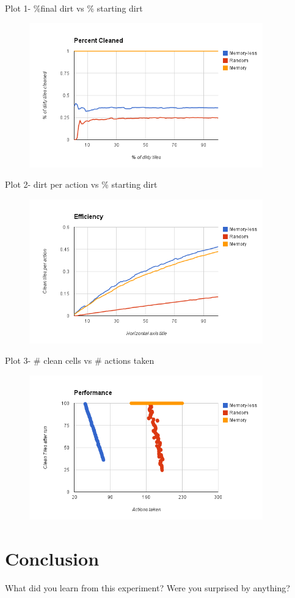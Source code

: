 \documentclass[a4paper,10pt]{article}
\begin{document}
Plot 1- \%final dirt vs \% starting dirt \\
\begin{figure}[!h]
	\begin{center}
		\includegraphics[width=0.9\textwidth]{image.png}
	\end{center}
\end{figure}


Plot 2- dirt per action vs \% starting dirt
\begin{figure}[!ht]
	\includegraphics[width=0.9\textwidth]{image1.png}
\end{figure}
Plot 3- \# clean cells vs \# actions taken
\begin{figure}[!ht]
	\includegraphics[width=0.9\textwidth]{image2.png}
\end{figure}

\section{Conclusion}
What did you learn from this experiment? Were you surprised by anything?
\end{document}
